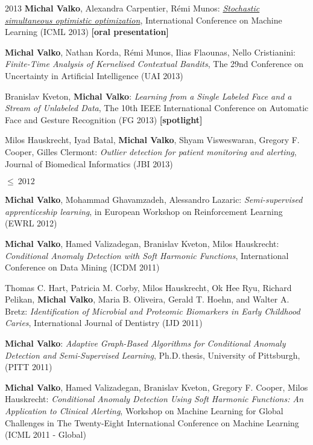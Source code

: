 \documentclass{resume}
\begin{document}
\begin{category}{2013}
\citembullet
{\bf Michal Valko}, Alexandra Carpentier, R\' emi Munos:
\href{http://researchers.lille.inria.fr/~valko/hp/serve.php?what=publications/valko2013stochastic.pdf}
{\emph{Stochastic simultaneous optimistic optimization}},
International Conference on Machine Learning
({\sf ICML 2013}) {\bf [oral presentation]}

\citembullet
{\bf Michal Valko}, Nathan Korda, R\' emi Munos, Ilias Flaounas, Nello 
Cristianini:
\emph{Finite-Time Analysis of Kernelised Contextual Bandits},
The 29nd Conference on Uncertainty in Artificial Intelligence
({\sf UAI 2013})

\citembullet
Branislav Kveton, {\bf Michal Valko}:
\emph{Learning from a Single Labeled Face and a Stream of Unlabeled Data},
The 10th IEEE International Conference on Automatic Face and Gesture Recognition
({\sf FG 2013})
{\bf [spotlight]}

\citembullet
Milos Hauskrecht, Iyad Batal, {\bf Michal Valko}, Shyam Visweswaran,
Gregory F. Cooper, Gilles Clermont: \emph{Outlier detection for patient
monitoring and alerting}, Journal of Biomedical Informatics ({\sf JBI 2013})

\end{category}\begin{category}{$\leq\ 2012$}


\citembullet
{\bf Michal Valko}, Mohammad Ghavamzadeh, Alessandro Lazaric:
\emph{Semi-supervised apprenticeship learning}, in European Workshop on
Reinforcement Learning
({\sf EWRL 2012})


\citembullet
{\bf Michal Valko}, Hamed Valizadegan, Branislav Kveton, Milos Hauskrecht:
\emph{Conditional Anomaly Detection with Soft Harmonic Functions},
International Conference on Data Mining ({\sf ICDM 2011}) 

\citembullet  
Thomas C. Hart, Patricia M. Corby, Milos Hauskrecht, Ok Hee Ryu, Richard Pelikan, {\bf Michal Valko}, Maria B. Oliveira, Gerald T. Hoehn, and Walter A. Bretz: \emph{Identification of Microbial and Proteomic Biomarkers in Early Childhood Caries}, International Journal of Dentistry ({\sf IJD 2011}) 

\citembullet  
{\bf Michal Valko}: 
\emph {Adaptive Graph-Based Algorithms for Conditional Anomaly Detection and Semi-Supervised Learning}, 
Ph.D.\,thesis, University of Pittsburgh, ({\sf PITT 2011}) 

\citembullet
{\bf Michal Valko}, Hamed Valizadegan, Branislav Kveton, Gregory F. Cooper, Milos Hauskrecht:
\emph{Conditional Anomaly Detection Using Soft Harmonic Functions: An Application to Clinical Alerting}, Workshop on Machine Learning for Global Challenges in The Twenty-Eight International Conference on
Machine Learning ({\sf ICML 2011 - Global})


\end{category}
\end{document}
